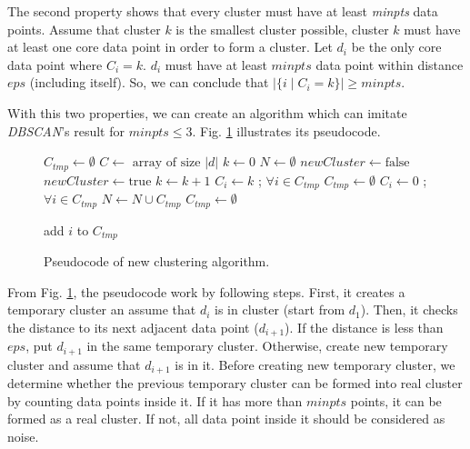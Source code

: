 \documentclass[conference]{IEEEtran}
\begin{document}
The second property shows that every cluster must have at least \textit{minpts} data points. Assume that cluster $k$ is the smallest cluster possible, cluster $k$ must have at least one core data point in order to form a cluster. Let $d_{i}$ be the only core data point where $C_{i} = k$. $d_{i}$ must have at least $\textit{minpts}$ data point within distance $\textit{eps}$ (including itself). So, we can conclude that $|\{i \mid C_{i} = k\}| \ge \textit{minpts}$.

With this two properties, we can create an algorithm which can imitate \textit{DBSCAN}'s result for $\textit{minpts} \le 3$. Fig. \ref{fig:clustering_pseudocode} illustrates its pseudocode.

\begin{figure}
\begin{algorithmic}[1]
  \State $C_{tmp} \gets \emptyset$
  \State $C \gets \text{ array of size } |d|$
  \State $k \gets 0$
  \State $N \gets \emptyset$
    \State $newCluster \gets \text{false}$
      \State $newCluster \gets \text{true}$
    \EndIf
        \State $k \gets k + 1$          
      \State $C_{i} \gets k$ ; $\forall i \in C_{tmp}$
      \State $C_{tmp} \gets \emptyset$
      \State $C_{i} \gets 0$ ; $\forall i \in C_{tmp}$      
      \State $N \gets N \cup C_{tmp}$
      \State $C_{tmp} \gets \emptyset$
    \EndIf
    
    \State add $i$ to $C_{tmp}$ 
    
  \EndFor
  \State {}
\EndProcedure 
\end{algorithmic}
\caption{Pseudocode of new clustering algorithm.}
\label{fig:clustering_pseudocode}
\end{figure}

From Fig. \ref{fig:clustering_pseudocode}, the pseudocode work by following steps. First, it creates a temporary cluster an assume that $d_{i}$ is in cluster (start from $d_{1}$). Then, it checks the distance to its next adjacent data point ($d_{i+1}$). If the distance is less than $eps$, put $d_{i+1}$ in the same temporary cluster. Otherwise, create new temporary cluster and assume that $d_{i+1}$ is in it. Before creating new temporary cluster, we determine whether the previous temporary cluster can be formed into real cluster by counting data points inside it. If it has more than $minpts$ points, it can be formed as a real cluster. If not, all data point inside it should be considered as noise.
\end{document}
